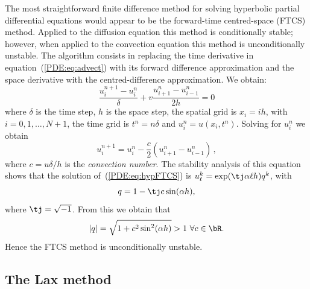 The most straightforward finite difference method for solving
hyperbolic partial differential equations would appear to be the
forward-time centred-space (FTCS) method.  Applied to the diffusion
equation this method is conditionally stable; however, when applied to
the convection equation this method is unconditionally unstable.  The
algorithm consists in replacing the time derivative in
equation~(\ref{PDE:eq:advect}) with its forward difference
approximation and the space derivative with the centred-difference
approximation.  We obtain:
%
\begin{equation*}
  \frac{u_{i}^{n+1}-u_{i}^{n}}{\delta} +
  v \frac{u_{i+1}^{n}-u_{i-1}^{n}}{2 h} = 0
\end{equation*}
%
where $\delta$ is the time step, $h$ is the space step, the spatial
grid is $x_i = i h$, with $i=0,1,\ldots,N+1$, the time grid is $t^n =
n \delta$ and $u_{i}^{n} = u(x_i,t^n)$.  Solving for $u_{i}^{n}$ we
obtain
%
\begin{equation}
  u_{i}^{n+1} = u_{i}^{n} - \frac{c}{2} (u_{i+1}^{n}-u_{i-1}^{n}) \, ,
  \label{PDE:eq:hypFTCS}
\end{equation}
%
where $c = u \delta/h$ is the \textit{convection number}.  The
stability analysis of this equation shows that the solution
of~(\ref{PDE:eq:hypFTCS}) is $u_{\ell}^{k} = \exp(\tj \alpha \ell h)
q^k$, with
%
\begin{equation*}
  q = 1 - \tj c \sin(\alpha h) ,
\end{equation*}
%
where $\tj = \sqrt{-1}$.  From this we obtain that
%
\begin{equation*}
  |q| = \sqrt{1 + c^2 \sin^2(\alpha h)} > 1 \, \, \forall c \in \bR .
\end{equation*}
%
Hence the FTCS method is unconditionally unstable.

\subsection{The Lax method}


